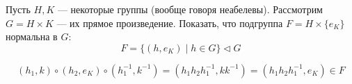 

\cfoot{}



\begin{exercise}
    Пусть \(H, K\) --- некоторые группы (вообще говоря неабелевы). Рассмотрим \(G = H \times K\) --- их прямое произведение. Показать, что подгруппа \(F = H \times \{e_K\}\) нормальна в \(G\):
    \[F = \{(h, e_K) \mid h \in G\} \vartriangleleft G\]
\end{exercise}
\begin{solution}
    \[(h_1, k) \circ (h_2, e_K) \circ (h_1^{-1}, k^{-1}) = (h_1 h_2 h_1^{-1}, kk^{-1}) = (h_1h_2h_1^{-1}, e_K) \in F\]
\end{solution}

